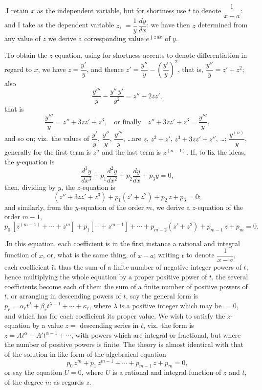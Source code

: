 \documentclass[11pt]{article}
\begin{document}
\medskip

.\quad I retain $x$ as the independent variable, but for shortness use $t$ to denote $\dfrac{1}{x-a}$: and I take as the dependent variable $z$, $= \dfrac{1}{y}\,\dfrac{dy}{dx}$: we have then $z$ determined from any value of $z$ we derive a corresponding value $e^{\int z\,dx}$ of $y$.

\medskip

.\quad To obtain the $z$-equation, using for shortness accents to denote differentiation in regard to $x$, we have $z = \dfrac{y'}{y}$, and thence $z' = \dfrac{y''}{y} - \left(\dfrac{y'}{y}\right)^{2}$, that is, $\dfrac{y''}{y} = z' + z^{2}$; also
\[
\frac{y'''}{y} - \frac{y''\,y'}{y^{2}} = z'' + 2zz',
\]
that is
\[
\frac{y'''}{y} = z'' + 3zz' + z^{3},\quad\text{or finally}\quad z'' + 3zz' + z^{3} = \frac{y'''}{y},
\]
and so on; viz.\ the values of $\dfrac{y'}{y}$, $\dfrac{y''}{y}$, $\dfrac{y'''}{y}$, \ldots are $z$, $z^{2} + z'$, $z^{3} + 3zz' + z''$, \ldots; $\dfrac{y^{(n)}}{y}$, generally for the first term is $z^{n}$ and the last term is $z^{(n-1)}$. If, to fix the ideas, the $y$-equation is
\[
\frac{d^{3}y}{dx^{3}} + p_{1}\frac{d^{2}y}{dx^{2}} + p_{2}\frac{dy}{dx} + p_{3}y = 0,
\]
then, dividing by $y$, the $z$-equation is
\[
(z'' + 3zz' + z^{3}) + p_{1}(z' + z^{2}) + p_{2}\,z + p_{3} = 0;
\]
and similarly, from the $y$-equation of the order $m$, we derive a $z$-equation of the order $m-1$,
\[
p_{0}\,[z^{(m-1)} + \cdots + z^{m}] + p_{1}[\cdots + z^{m-1}] + \cdots + p_{m-2}(z' + z^{2}) + p_{m-1}\,z + p_{m} = 0.
\]

\medskip

.\quad In this equation, each coefficient is in the first instance a rational and integral function of $x$, or, what is the same thing, of $x-a$; writing $t$ to denote $\dfrac{1}{x-a}$, each coefficient is thus the sum of a finite number of negative integer powers of $t$; hence multiplying the whole equation by a proper positive power of $t$, the several coefficients become each of them the sum of a finite number of positive powers of $t$, or arranging in descending powers of $t$, say the general form is $p_{r} = \alpha_{r}t^{\lambda} + \beta_{r}t^{\lambda-1} + \cdots + \kappa_{r}$, where $\lambda$ is a positive integer which may be $=0$, and which has for each coefficient its proper value. We wish to satisfy the $z$-equation by a value $z = $ descending series in $t$, viz.\ the form is $z = At^{\alpha} + A't^{\alpha-1} + \cdots$, with powers which are integral or fractional, but where the number of positive powers is finite. The theory is almost identical with that of the solution in like form of the algebraical equation
\[
p_{0}\,z^{m} + p_{1}\,z^{m-1} + \cdots + p_{m-1}\,z + p_{m} = 0,
\]
or say the equation $U = 0$, where $U$ is a rational and integral function of $z$ and $t$, of the degree $m$ as regards $z$.
\end{document}
